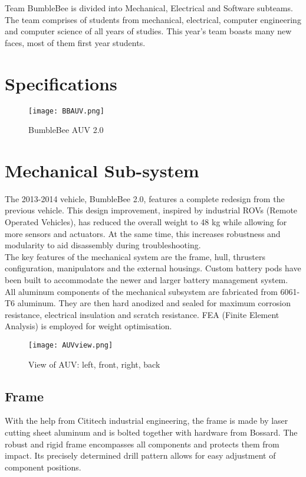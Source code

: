 \documentclass[journal,12pt]{IEEEtran}
\begin{document}
Team BumbleBee is divided into Mechanical, Electrical and Software subteams. The team comprises of students from mechanical, electrical, computer engineering and computer science of all years of studies. This year's team boasts many new faces, most of them first year students. 

\section{Specifications}

\begin{figure}[h]
\centering
\texttt{[image: BBAUV.png]}
\caption{BumbleBee AUV 2.0}
\end{figure}


\section{Mechanical Sub-system}
The 2013-2014 vehicle, BumbleBee 2.0, features a complete redesign from the previous vehicle. This design improvement, inspired by industrial ROVs (Remote Operated Vehicles), has reduced the overall weight to 48 kg while allowing for more sensors and actuators. At the same time, this increases robustness and modularity to aid disassembly during troubleshooting. \\

The key features of the mechanical system are the frame, hull, thrusters configuration, manipulators and the external housings. Custom battery pods have been built to accommodate the newer and larger battery management system. \\

All aluminum components of the mechanical subsystem are fabricated from 6061-T6 aluminum. They are then hard anodized and sealed for maximum corrosion resistance, electrical insulation and scratch resistance. FEA (Finite Element Analysis) is employed for weight optimisation.

\begin{figure}[h]
\centering
\texttt{[image: AUVview.png]}
\captionsetup{justification=centering}
\caption{View of AUV: left, front, right, back}
\end{figure}

\subsection{Frame}
With the help from Cititech industrial engineering, the frame is made by laser cutting sheet aluminum and is bolted together with hardware from Bossard. The robust and rigid frame encompasses all components and protects them from impact. Its precisely determined drill pattern allows for easy adjustment of component positions.
\end{document}
